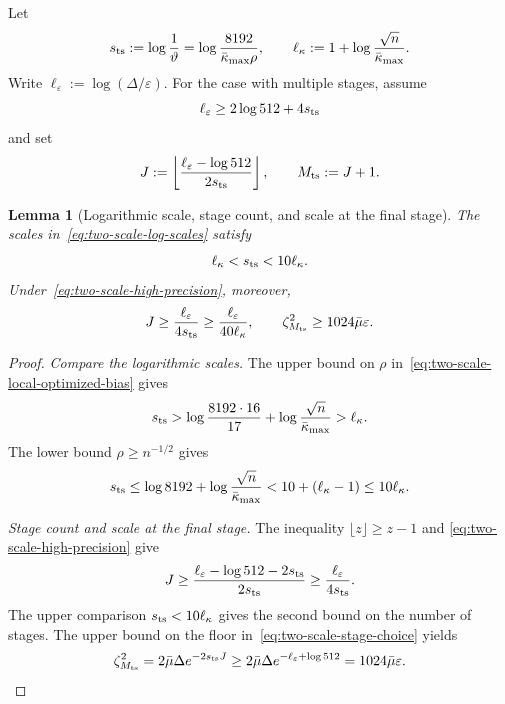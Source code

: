 \documentclass{article}
\newtheorem{lemma}[theorem]{Lemma}
\theoremstyle{definition}
\begin{document}
Let
\begin{equation}
 s_{\rm ts}:=\log\frac1\vartheta
 =\log\frac{8192}{\bar\kappa_{\max}\rho},
 \qquad
 \ell_\kappa:=1+\log\frac{\sqrt n}{\bar\kappa_{\max}}.
 \label{eq:two-scale-log-scales}
\end{equation}
Write $\ell_\varepsilon:=\log(\Delta/\varepsilon)$.  For the case with multiple stages,
assume
\begin{equation}
 \ell_\varepsilon\ge2\log512+4s_{\rm ts}
 \label{eq:two-scale-high-precision}
\end{equation}
and set
\begin{equation}
 J:=\left\lfloor
 \frac{\ell_\varepsilon-\log512}{2s_{\rm ts}}
 \right\rfloor,
 \qquad M_{\rm ts}:=J+1.
 \label{eq:two-scale-stage-choice}
\end{equation}

\begin{lemma}[Logarithmic scale, stage count, and scale at the final stage]
\label{lem:two-scale-stage-count}
The scales in~\eqref{eq:two-scale-log-scales} satisfy
\begin{equation}
 \ell_\kappa<s_{\rm ts}<10\ell_\kappa.
 \label{eq:two-scale-log-comparison}
\end{equation}
Under~\eqref{eq:two-scale-high-precision}, moreover,
\begin{equation}
 J\ge\frac{\ell_\varepsilon}{4s_{\rm ts}}
 \ge\frac{\ell_\varepsilon}{40\ell_\kappa},
 \qquad
 \zeta_{M_{\rm ts}}^2\ge1024\bar\mu\varepsilon.
 \label{eq:two-scale-stage-residual}
\end{equation}
\end{lemma}

\begin{proof}
\emph{Compare the logarithmic scales.}
The upper bound on $\rho$ in~\eqref{eq:two-scale-local-optimized-bias} gives
\begin{equation}
 s_{\rm ts}>
 \log\frac{8192\cdot16}{17}
 +\log\frac{\sqrt n}{\bar\kappa_{\max}}>\ell_\kappa.
\end{equation}
The lower bound $\rho\ge n^{-1/2}$ gives
\begin{equation}
 s_{\rm ts}\le\log8192+\log\frac{\sqrt n}{\bar\kappa_{\max}}
 <10+(\ell_\kappa-1)\le10\ell_\kappa.
\end{equation}

\emph{Stage count and scale at the final stage.}
The inequality $\lfloor z\rfloor\ge z-1$ and
\eqref{eq:two-scale-high-precision} give
\begin{equation}
 J\ge
 \frac{\ell_\varepsilon-\log512-2s_{\rm ts}}{2s_{\rm ts}}
 \ge\frac{\ell_\varepsilon}{4s_{\rm ts}}.
\end{equation}
The upper comparison $s_{\rm ts}<10\ell_\kappa$ gives the second bound on the number of stages.
The upper bound on the floor in~\eqref{eq:two-scale-stage-choice} yields
\begin{equation}
 \zeta_{M_{\rm ts}}^2
 =2\bar\mu\Delta e^{-2s_{\rm ts}J}
 \ge2\bar\mu\Delta e^{-\ell_\varepsilon+\log512}
 =1024\bar\mu\varepsilon.
\end{equation}
\end{proof}
\end{document}
